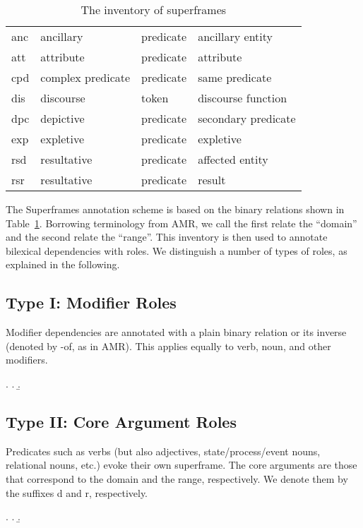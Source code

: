 \documentclass[a4paper]{article}
\begin{document}
\begin{table}
\begin{tabular}{llll}
        anc & ancillary & predicate & ancillary entity \\
        att & attribute & predicate & attribute \\
        cpd & complex predicate & predicate & same predicate \\
        dis & discourse & token & discourse function \\
        dpc & depictive & predicate & secondary predicate\\
        exp & expletive & predicate & expletive \\
        rsd & resultative & predicate & affected entity \\
        rsr & resultative & predicate & result \\ 
        \bottomrule
    \end{tabular}
    \caption{The inventory of superframes}
    \label{tab:inventory}
\end{table}

The Superframes annotation scheme is based on the binary relations shown in Table~\ref{tab:inventory}. Borrowing terminology from AMR, we call the first relate the ``domain'' and the second relate the ``range''. This inventory is then used to annotate bilexical dependencies with roles. We distinguish a number of types of roles, as explained in the following.

\subsection{Type I: Modifier Roles}

Modifier dependencies are annotated with a plain binary relation or its inverse (denoted by \textsf{-of}, as in AMR). This applies equally to verb, noun, and other modifiers.

\ex. \a. 
     \b. 

\subsection{Type II: Core Argument Roles}

Predicates such as verbs (but also adjectives, state/process/event nouns, relational nouns, etc.) evoke their own superframe. The core arguments are those that correspond to the domain and the range, respectively. We denote them by the suffixes \textsf{d} and \textsf{r}, respectively.

\ex. \a. 
     \b. 
\end{document}
